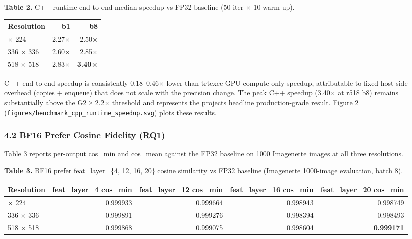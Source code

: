 \documentclass[
]{article}
\newcounter{none} %
\begin{document}
\textbf{Table 2.} C++ runtime end-to-end median speedup vs FP32 baseline
(50 iter × 10 warm-up).

{\def\LTcaptype{none} %
\begin{longtable}[]{@{}lrr@{}}
\toprule\noalign{}
Resolution & b1 & b8 \\
\midrule\noalign{}
\endhead
\bottomrule\noalign{}
\endlastfoot
224 × 224 & 2.27× & 2.50× \\
336 × 336 & 2.60× & 2.85× \\
518 × 518 & 2.83× & \textbf{3.40×} \\
\end{longtable}
}

C++ end-to-end speedup is consistently 0.18--0.46× lower than trtexec
GPU-compute-only speedup, attributable to fixed host-side overhead
(copies + enqueue) that does not scale with the precision change. The
peak C++ speedup (3.40× at r518 b8) remains substantially above the G2 ≥
2.2× threshold and represents the project\textquotesingle s headline
production-grade result. Figure 2
(\texttt{figures/benchmark\_cpp\_runtime\_speedup.svg}) plots these
results.

\subsubsection{4.2 BF16 Prefer Cosine Fidelity
(RQ1)}\label{42-bf16-prefer-cosine-fidelity-rq1}

Table 3 reports per-output cos\_min and cos\_mean against the FP32
baseline on 1000 Imagenette images at all three resolutions.

\textbf{Table 3.} BF16 prefer feat\_layer\_\{4, 12, 16, 20\} cosine
similarity vs FP32 baseline (Imagenette 1000-image evaluation, batch 8).

{\def\LTcaptype{none} %
\begin{longtable}[]{@{}lrrrr@{}}
\toprule\noalign{}
Resolution & feat\_layer\_4 cos\_min & feat\_layer\_12 cos\_min &
feat\_layer\_16 cos\_min & feat\_layer\_20 cos\_min \\
\midrule\noalign{}
\endhead
\bottomrule\noalign{}
\endlastfoot
224 × 224 & 0.999933 & 0.999664 & 0.998943 & 0.998749 \\
336 × 336 & 0.999891 & 0.999276 & 0.998394 & 0.998493 \\
518 × 518 & 0.999868 & 0.999075 & 0.998604 & \textbf{0.999171} \\
\end{longtable}
}
\end{document}
